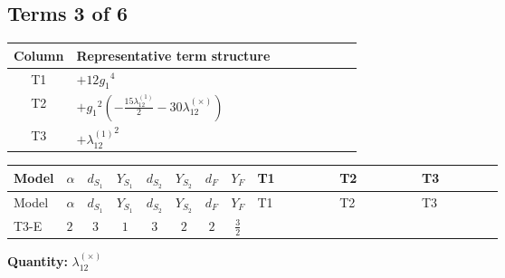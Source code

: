 \documentclass[8pt]{article}
\begin{document}
\begin{landscape}
\subsection*{Terms 3 of 6}
\begin{center}
\begin{tabular}{@{}c >{\raggedright\arraybackslash}p{0.82\linewidth}@{}}
\toprule
Column & Representative term structure \\
\midrule
T1 & \(\displaystyle +12 {g_1}^4\) \\
\midrule
T2 & \(\displaystyle +{g_1}^2 \left(-\frac{15 {\lambda_{12}^{(1)}}}{2}-30 {\lambda_{12}^{(\times)}}\right)\) \\
\midrule
T3 & \(\displaystyle +{\lambda_{12}^{(1)}}^2\) \\
\midrule
\bottomrule
\end{tabular}
\end{center}
\smallskip
\tiny
\begin{longtable}{@{}llcccccc >{\raggedright\arraybackslash}p{0.21\linewidth} >{\raggedright\arraybackslash}p{0.21\linewidth} >{\raggedright\arraybackslash}p{0.21\linewidth}@{}}
\toprule
Model & $\alpha$ & $d_{S_1}$ & $Y_{S_1}$ & $d_{S_2}$ & $Y_{S_2}$ & $d_F$ & $Y_F$ & T1 & T2 & T3 \\
\midrule
\endfirsthead
\toprule
Model & $\alpha$ & $d_{S_1}$ & $Y_{S_1}$ & $d_{S_2}$ & $Y_{S_2}$ & $d_F$ & $Y_F$ & T1 & T2 & T3 \\
\midrule
\endhead
T3-E & $2$ & $3$ & $1$ & $3$ & $2$ & $2$ & $\frac{3}{2}$ & \scriptsize\adjustbox{max width=\linewidth}{$\begin{gathered} +12 {g_1}^4\end{gathered}$} & \scriptsize\adjustbox{max width=\linewidth}{$\begin{gathered} +{g_1}^2 \left(-\frac{15 {\lambda_{12}^{(1)}}}{2}-30 {\lambda_{12}^{(\times)}}\right)\end{gathered}$} & \scriptsize\adjustbox{max width=\linewidth}{$\begin{gathered} +{\lambda_{12}^{(1)}}^2\end{gathered}$} \\
\midrule
\bottomrule
\end{longtable}
\clearpage
\noindent\textbf{Quantity: }$\lambda_{12}^{(\times)}$\par\smallskip

\end{landscape}
\end{document}
